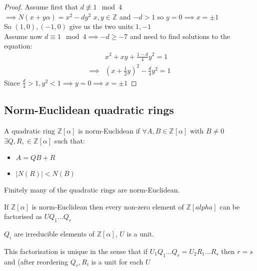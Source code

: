 \documentclass[11pt]{article}
\begin{document}
\begin{proof}
	Assume first that $d\not \equiv 1 \mod 4$\\[1em]
	$\implies N(x+y\alpha) = x^2 - dy^2 $ \hspace{20pt} $x,y \in \mathbb{Z} $ and $-d>1$ so $y=0 \implies x= \pm 1$
	\\[1em]

	So $(1,0), (-1,0)$ give us the two units $1 ,-1$\\[1em]

	Assume now $d \equiv1 \mod 4 \implies -d\geq -7 $ and need to find solutions to the equation:
	\begin{align*}
		&x^2 +xy+ \frac{1-d}{4}y^2 = 1\\[1em]
		\implies & (x+\frac{1}{2}y)^2 - \frac{d}{4}y^2 = 1
	\end{align*}
	Since $\frac{d}{4} > 1, y^2 < 1 \implies y=0 \implies x=\pm 1$


\end{proof}




\subsection{Norm-Euclidean quadratic rings}

\begin{definition}
	A quadratic ring $\mathbb{Z}[\alpha]$ is norm-Euclidean if $\forall A,B \in \mathbb{Z}[\alpha] $ with $B\neq 0$ \hspace{7pt}$ \exists Q,R, \in \mathbb{Z}[\alpha] $ such that:


	\begin{itemize}
		\item{$A = QB + R$}
		\item{$|N(R)| < N(B)$}
	\end{itemize}
\end{definition}


Finitely many of the quadratic rings are norm-Euclidean.


\begin{theorem}
	If $\mathbb{Z}[\alpha]$ is norm-Euclidean then every non-zero element of $\mathbb{Z}[alpha]$ can be factorised as $UQ_1\dots Q_r$
\end{theorem}
$Q_i $ are irreducible elements of $\mathbb{Z}[\alpha] $, $U$ is a unit.

This factorisation is unique in the sense that if $U_1Q_1\dots Q_r=U_2R_1 \dots R_s$ then $r=s$ and (after reordering $Q_r, R_i$ is a unit for each $U$
\end{document}
